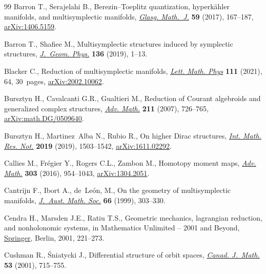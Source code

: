 \documentclass[pdftex]{sigma}
\numberwithin{equation}{section}
\begin{document}
\begin{thebibliography}{99}
Barron T., Serajelahi B., Berezin--{T}oeplitz quantization, hyperk\"ahler
  manifolds, and multisymplectic manifolds, \href{https://doi.org/10.1017/S0017089516000100}{\textit{Glasg. Math.~J.}}
  \textbf{59} (2017), 167--187, \href{https://arxiv.org/abs/1406.5159}{arXiv:1406.5159}.

Barron T., Shafiee M., Multisymplectic structures induced by symplectic
  structures, \href{https://doi.org/10.1016/j.geomphys.2018.10.008}{\textit{J.~Geom. Phys.}} \textbf{136} (2019), 1--13.

Blacker C., Reduction of multisymplectic manifolds, \href{https://doi.org/10.1007/s11005-021-01408-y}{\textit{Lett. Math. Phys}}
  \textbf{111} (2021), 64, 30~pages, \href{https://arxiv.org/abs/2002.10062}{arXiv:2002.10062}.

Bursztyn H., Cavalcanti G.R., Gualtieri M., Reduction of {C}ourant algebroids
  and generalized complex structures, \href{https://doi.org/10.1016/j.aim.2006.09.008}{\textit{Adv. Math.}} \textbf{211} (2007),
  726--765, \href{https://arxiv.org/abs/math.DG/0509640}{arXiv:math.DG/0509640}.

Bursztyn H., Martinez~Alba N., Rubio R., On higher {D}irac structures,
  \href{https://doi.org/10.1093/imrn/rnx163}{\textit{Int. Math. Res. Not.}} \textbf{2019} (2019), 1503--1542,
  \href{https://arxiv.org/abs/1611.02292}{arXiv:1611.02292}.

Callies M., Fr\'egier Y., Rogers C.L., Zambon M., Homotopy moment maps,
  \href{https://doi.org/10.1016/j.aim.2016.08.012}{\textit{Adv. Math.}} \textbf{303} (2016), 954--1043, \href{https://arxiv.org/abs/1304.2051}{arXiv:1304.2051}.

Cantrijn F., Ibort A., de~Le\'on, M., On the geometry of multisymplectic
  manifolds, \href{https://doi.org/10.1017/S1446788700036636}{\textit{J.~Aust. Math. Soc.}} \textbf{66} (1999), 303--330.

Cendra H., Marsden J.E., Ratiu T.S., Geometric mechanics, lagrangian reduction,
  and nonholonomic systems, in Mathematics Unlimited -- 2001 and Beyond,
  \href{https://doi.org/10.1007/978-3-642-56478-9_10}{Springer}, Berlin, 2001, 221--273.

Cushman R., \'Sniatycki J., Differential structure of orbit spaces,
  \href{https://doi.org/10.4153/CJM-2001-029-1}{\textit{Canad. J.~Math.}} \textbf{53} (2001), 715--755.


\end{thebibliography}
\end{document}
